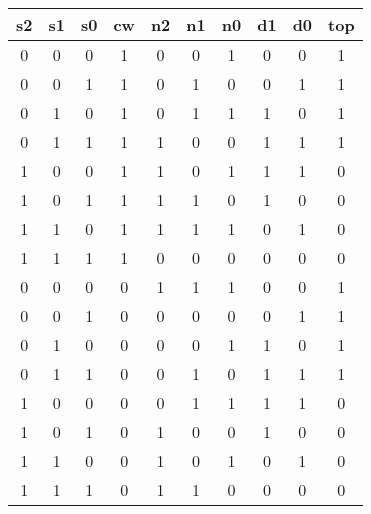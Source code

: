 \begin{center}
\begin{tabular}{cccc|cccccc}
s2 & s1 & s0 & cw & n2 & n1 & n0 & d1 & d0 & top\tabularnewline
\hline
\hline 
0 & 0 & 0 & 1 & 0 & 0 & 1 & 0 & 0 & 1\tabularnewline
\hline
0 & 0 & 1 & 1 & 0 & 1 & 0 & 0 & 1 & 1\tabularnewline
\hline 
0 & 1 & 0 & 1 & 0 & 1 & 1 & 1 & 0 & 1\tabularnewline
\hline 
0 & 1 & 1 & 1 & 1 & 0 & 0 & 1 & 1 & 1\tabularnewline
\hline 
1 & 0 & 0 & 1 & 1 & 0 & 1 & 1 & 1 & 0\tabularnewline
\hline 
1 & 0 & 1 & 1 & 1 & 1 & 0 & 1 & 0 & 0\tabularnewline
\hline 
1 & 1 & 0 & 1 & 1 & 1 & 1 & 0 & 1 & 0\tabularnewline
\hline 
1 & 1 & 1 & 1 & 0 & 0 & 0 & 0 & 0 & 0\tabularnewline
\hline 
0 & 0 & 0 & 0 & 1 & 1 & 1 & 0 & 0 & 1\tabularnewline
\hline 
0 & 0 & 1 & 0 & 0 & 0 & 0 & 0 & 1 & 1\tabularnewline
\hline 
0 & 1 & 0 & 0 & 0 & 0 & 1 & 1 & 0 & 1\tabularnewline
\hline 
0 & 1 & 1 & 0 & 0 & 1 & 0 & 1 & 1 & 1\tabularnewline
\hline 
1 & 0 & 0 & 0 & 0 & 1 & 1 & 1 & 1 & 0\tabularnewline
\hline 
1 & 0 & 1 & 0 & 1 & 0 & 0 & 1 & 0 & 0\tabularnewline
\hline 
1 & 1 & 0 & 0 & 1 & 0 & 1 & 0 & 1 & 0\tabularnewline
\hline 
1 & 1 & 1 & 0 & 1 & 1 & 0 & 0 & 0 & 0\tabularnewline
\hline
\end{tabular}
\end{center}